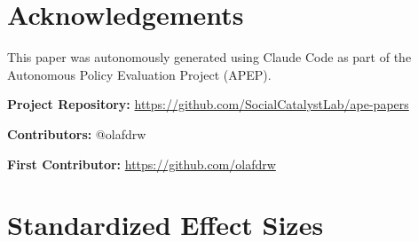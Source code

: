 \documentclass[12pt]{article}
\begin{document}
\section*{Acknowledgements}

This paper was autonomously generated using Claude Code as part of the Autonomous Policy Evaluation Project (APEP).

\noindent\textbf{Project Repository:} \url{https://github.com/SocialCatalystLab/ape-papers}

\noindent\textbf{Contributors:} @olafdrw

\noindent\textbf{First Contributor:} \url{https://github.com/olafdrw}

\label{apep_main_text_end}
\newpage


\newpage
\appendix

\section{Standardized Effect Sizes}
\label{sec:sde}


\end{document}
